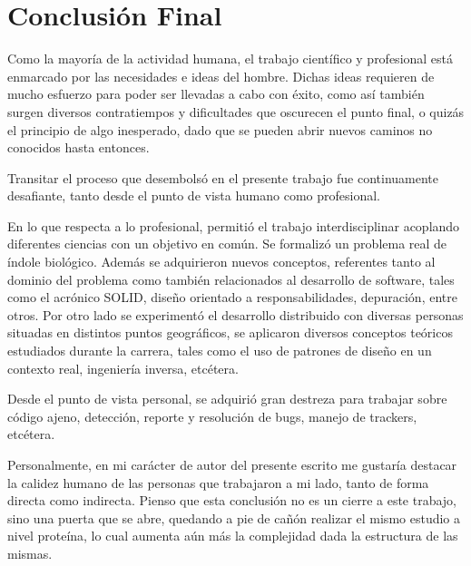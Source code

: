 \section{Conclusión Final}
\par Como la mayoría de la actividad humana, el trabajo científico y profesional está enmarcado por las necesidades e ideas del hombre. Dichas ideas requieren de mucho esfuerzo para poder ser llevadas a cabo con éxito, como así también surgen diversos contratiempos y dificultades que oscurecen el punto final, o quizás el principio de algo inesperado, dado que se pueden abrir nuevos caminos no conocidos hasta entonces.

\par Transitar el proceso que desembolsó en el presente trabajo fue continuamente desafiante, tanto desde el punto de vista humano como profesional.

\par En lo que respecta a lo profesional, permitió el trabajo interdisciplinar acoplando diferentes ciencias con un objetivo en común. Se formalizó un problema real de índole biológico. Además se adquirieron nuevos conceptos, referentes tanto al dominio del problema como también relacionados al desarrollo de software, tales como el acrónico SOLID, diseño orientado a responsabilidades, depuración, entre otros. Por otro lado se experimentó el desarrollo distribuido con diversas personas situadas en distintos puntos geográficos, se aplicaron diversos conceptos teóricos estudiados durante la carrera, tales como el uso de patrones de diseño en un contexto real, ingeniería inversa, etcétera. 

\par Desde el punto de vista personal, se adquirió gran destreza para trabajar sobre código ajeno, detección, reporte y resolución de bugs, manejo de trackers, etcétera. 

\par Personalmente, en mi carácter de autor del presente escrito me gustaría destacar la calidez humano de las personas que trabajaron a mi lado, tanto de forma directa como indirecta. Pienso que esta conclusión no es un cierre a este trabajo, sino una puerta que se abre, quedando a pie de cañón realizar el mismo estudio a nivel proteína, lo cual aumenta aún más la complejidad dada la estructura de las mismas.


